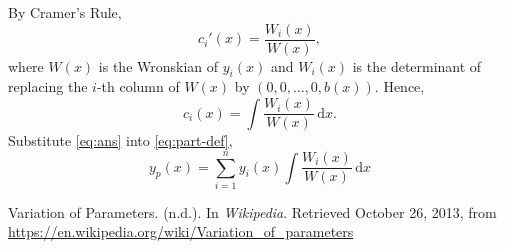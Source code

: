\documentclass[a4paper,12pt]{article}
\newcommand{\ud}{\,\mathrm{d}}
\begin{document}
By Cramer's Rule,
\[
  c_i'(x)=\frac{W_i(x)}{W(x)},
\]
where $W(x)$ is the Wronskian of $y_i(x)$ and $W_i(x)$ is the
determinant of replacing the $i$-th column of $W(x)$ by
$(0,0,\dots,0,b(x))$. Hence,
\begin{equation}
  c_i(x)=\int \frac{W_i(x)}{W(x)} \ud x.
  \label{eq:ans}
\end{equation}
Substitute \eqref{eq:ans} into \eqref{eq:part-def},
\[
  \boxed{y_p(x)=\sum_{i=1}^{n} y_i(x) \int \frac{W_i(x)}{W(x)} \ud x}
\]
\begin{thebibliography}{9}
    Variation of Parameters. (n.d.). In \emph{Wikipedia}. Retrieved
    October 26, 2013, from
    \url{https://en.wikipedia.org/wiki/Variation_of_parameters}
\end{thebibliography}
\end{document}

